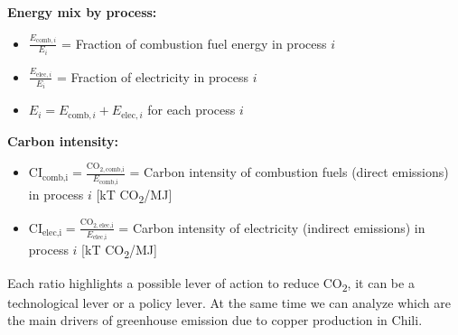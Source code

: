 \textbf{Energy mix by process:}
\begin{itemize}
    \item $\frac{E_{\text{comb},i}}{E_i}$ = Fraction of combustion fuel energy in process $i$
    \item $\frac{E_{\text{elec},i}}{E_i}$ = Fraction of electricity in process $i$
    \item $E_i = E_{\text{comb},i} + E_{\text{elec},i}$ for each process $i$
\end{itemize}

\textbf{Carbon intensity:}
\begin{itemize}
    \item $\text{CI}_{\text{comb,i}} = \frac{\text{CO}_{2,\text{comb,i}}}{E_{\text{comb,i}}}$ = Carbon intensity of combustion fuels (direct emissions) in process $i$ [kT CO\textsubscript{2}/MJ]
    \item $\text{CI}_{\text{elec,i}} = \frac{\text{CO}_{2,\text{elec,i}}}{E_{\text{elec,i}}}$ = Carbon intensity of electricity (indirect emissions) in process $i$ [kT CO\textsubscript{2}/MJ]
\end{itemize}

Each ratio highlights a possible lever of action to reduce CO\textsubscript{2}, it can be a technological lever or a policy lever. At the same time we can analyze which are the main drivers of greenhouse emission due to copper production in Chili.
